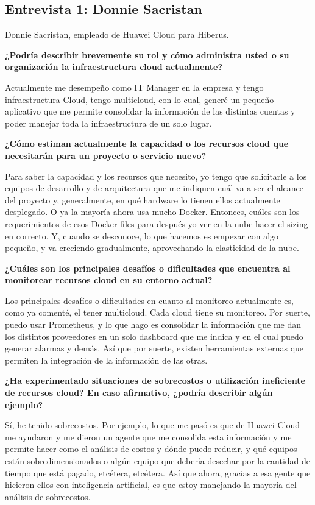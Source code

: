 
\subsection{Entrevista 1: Donnie Sacristan}

Donnie Sacristan, empleado de Huawei Cloud para Hiberus.

\textbf{¿Podría describir brevemente su rol y cómo administra usted o su organización la infraestructura cloud actualmente?}

Actualmente me desempeño como IT Manager en la empresa y tengo infraestructura Cloud, tengo multicloud, con lo cual, generé un pequeño aplicativo que me permite consolidar la información de las distintas cuentas y poder manejar toda la infraestructura de un solo lugar.

\textbf{¿Cómo estiman actualmente la capacidad o los recursos cloud que necesitarán para un proyecto o servicio nuevo?}

Para saber la capacidad y los recursos que necesito, yo tengo que solicitarle a los equipos de desarrollo y de arquitectura que me indiquen cuál va a ser el alcance del proyecto y, generalmente, en qué hardware lo tienen ellos actualmente desplegado. O ya la mayoría ahora usa mucho Docker. Entonces, cuáles son los requerimientos de esos Docker files para después yo ver en la nube hacer el sizing en correcto. Y, cuando se desconoce, lo que hacemos es empezar con algo pequeño, y va creciendo gradualmente, aprovechando la elasticidad de la nube.

\textbf{¿Cuáles son los principales desafíos o dificultades que encuentra al monitorear recursos cloud en su entorno actual?}

Los principales desafíos o dificultades en cuanto al monitoreo actualmente es, como ya comenté, el tener multicloud. Cada cloud tiene su monitoreo. Por suerte, puedo usar Prometheus, y lo que hago es consolidar la información que me dan los distintos proveedores en un solo dashboard que me indica y en el cual puedo generar alarmas y demás. Así que por suerte, existen herramientas externas que permiten la integración de la información de las otras.

\textbf{¿Ha experimentado situaciones de sobrecostos o utilización ineficiente de recursos cloud? En caso afirmativo, ¿podría describir algún ejemplo?}

Sí, he tenido sobrecostos. Por ejemplo, lo que me pasó es que de Huawei Cloud me ayudaron y me dieron un agente que me consolida esta información y me permite hacer como el análisis de costos y dónde puedo reducir, y qué equipos están sobredimensionados o algún equipo que debería desechar por la cantidad de tiempo que está pagado, etcétera, etcétera. Así que ahora, gracias a esa gente que hicieron ellos con inteligencia artificial, es que estoy manejando la mayoría del análisis de sobrecostos.

